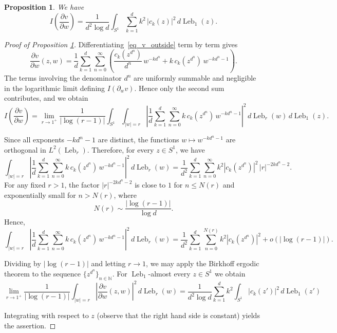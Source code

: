 \documentclass[10pt,a4paper]{amsart}
\newtheorem{prop}{Proposition}
\DeclareMathOperator{\Leb}{Leb}
\begin{document}
\begin{prop}\label{prop_extra_term}
We have
\[
I
\left(
\frac{\partial v}{\partial w}\right)
=
\frac{1}{d^2\log d
}
\int_{S^1}
\sum_{k=1}^d k^2\,|c_k(z)|^2\,
d\Leb_1 (z).
\]
\end{prop}

\begin{proof}[Proof of Proposition \ref{prop_extra_term}]
Differentiating~\eqref{eq_v_outside}
 term by term gives
\[
\frac{\partial v}{\partial w}(z,w)
=
\frac{1}{d}
\sum_{k=1}^d\sum_{n=0}^{\infty}
\left(
\frac{c_k(z^{d^n})}{d^n}\,w^{-k d^n}
+
k\,c_k(z^{d^n})\,w^{-k d^n-1}
\right).
\]
The terms involving the denominator $d^{n}
$ are uniformly summable and negligible in the
logarithmic limit defining $I(\partial_w v)$.
Hence only the second sum contributes, and we obtain
\[
I\!\left(\frac{\partial v}{\partial w}\right)
=
\lim_{r\to1^+}
\frac{1}{|\log(r-1)|}
\int_{S^1}
\int_{|w|=r}
\left|
\frac{1}{d}
\sum_{k=1}^d
\sum_{n=0}^{\infty}
k\,c_k(z^{d^n})\,w^{-k d^n-1}
\right|^2
\, 
d\Leb_r(w)\,
d\Leb_1(z).
\]

Since all exponents $-k d^n-1$ are distinct, the functions
$w\mapsto w^{-k d^n-1}$
 are orthogonal in $L^2(\Leb_r)$.
Therefore, for every $z\in S^1$, we have
\[
\int_{|w|=r}
\left|
\frac{1}{d}
\sum_{k=1}^d
\sum_{n=0}^{\infty}
k\,c_k(
z^{d^n}
)\,w^{-k d^n-1}
\right|^2
\,
d\Leb_r (w)
=
\frac{1}{d^2}
\sum_{k=1}^d\sum_{n=0}^{\infty}
k^2|c_k(z^{d^n})|^2\,|r|^{-2k d^n-2}.
\]
For any fixed $r>1$,
 the factor $|r|^{-2k d^n-2}$
  is close to $1$ for
$n\le N(r)$ and exponentially small for $n>N(r)$, where
\[
N(r)\sim\frac{|\log(r-1)|}{\log d}.
\]
Hence,
\[
\int_{|w|=r}
\left|
\frac{1}{d}
\sum_{k=1}^d
\sum_{n=0}^{\infty}
k\,c_k(z^{d^n})\,w^{-k d^n-1}
\right|^2
\,
d\Leb_r (w)
=
\frac{1}{d^2}
\sum_{k=1}^d\sum_{n=0}^{N(r)}
k^2|c_k(z^{d^n})|^2
+
o(|\log(r-1)|).
\]

Dividing by $|\log(r-1)|$ and letting $r\to1$, we may apply the Birkhoff
ergodic theorem to the sequence $\{z^{d^n}\}_{n\in \mathbb N}$.
For 
$\Leb_1$-almost every $z\in S^1$
 we obtain
\[
\lim_{r\to1^+}
\frac{1}{|\log(r-1)|}
\int_{|w|=r}
\left|\frac{\partial v}{\partial w}(z,w)\right|^2\,
d\Leb_r (w)
=
\frac{1}{d^2\log d}
\sum_{k=1}^d
k^2\int_{S^1}|c_k(z')|^2\,
d\Leb_1(z')
\]

Integrating with respect to $z$
(observe that the right hand side is constant)
 yields the assertion.
\end{proof}
\end{document}
